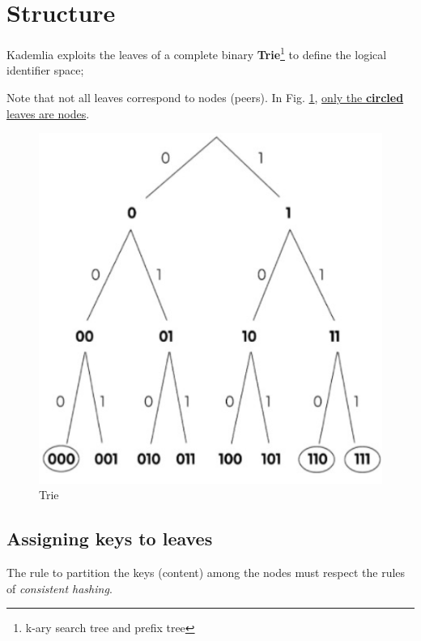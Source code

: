 \section{Structure}
\begin{paracol}{2}
   \colfill
   Kademlia exploits the leaves of a complete binary \textbf{Trie}\footnote{k-ary search tree and prefix tree} to define the logical identifier space;

   Note that not all leaves correspond to nodes (peers). In Fig. \ref{fig:kademlia_trie}, \ul{only the \textbf{circled} leaves are nodes}.
   \colfill
   \switchcolumn

   \begin{figure}[htbp]
      \centering
      \includegraphics{images/kademlia_trie.png}
      \caption{Trie}
      \label{fig:kademlia_trie}
   \end{figure}
\end{paracol}

\newpage
\subsection{Assigning keys to leaves}
The rule to partition the keys (content) among the nodes must respect the rules of \textit{consistent hashing}.


